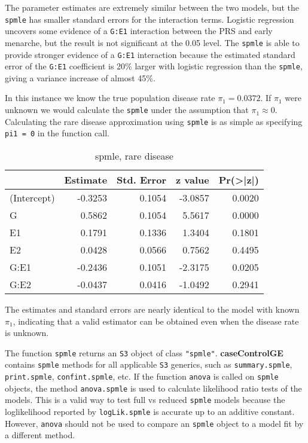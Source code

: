 \documentclass{article}\usepackage[]{graphicx}\usepackage[]{color}
\def\code#1{\texttt{#1}}
\def\pkg#1{\textbf{#1}}
\begin{document}
The parameter estimates are extremely similar between the two models, but the \code{spmle} has smaller standard errors for the interaction terms.  Logistic regression uncovers some evidence of a \code{G:E1} interaction between the PRS and early menarche, but the result is not significant at the 0.05 level.  The \code{spmle} is able to provide stronger evidence of a \code{G:E1} interaction because the estimated standard error of the \code{G:E1} coefficient is 20\% larger with logistic regression than the \code{spmle}, giving a variance increase of almost 45\%.

In this instance we know the true population disease rate $\pi_1=0.0372$.  If $\pi_1$ were unknown we would calculate the \code{spmle} under the assumption that $\pi_1 \approx 0$.  Calculating the rare disease approximation using \code{spmle} is as simple as specifying \code{pi1 = 0} in the function call.
\begin{Schunk}
\begin{table}

\caption{\label{tab:unnamed-chunk-6}spmle, rare disease}
\centering
\begin{tabular}[t]{l|r|r|r|r}
\hline
  & Estimate & Std. Error & z value & Pr(>|z|)\\
\hline
(Intercept) & -0.3253 & 0.1054 & -3.0857 & 0.0020\\
\hline
G & 0.5862 & 0.1054 & 5.5617 & 0.0000\\
\hline
E1 & 0.1791 & 0.1336 & 1.3404 & 0.1801\\
\hline
E2 & 0.0428 & 0.0566 & 0.7562 & 0.4495\\
\hline
G:E1 & -0.2436 & 0.1051 & -2.3175 & 0.0205\\
\hline
G:E2 & -0.0437 & 0.0416 & -1.0492 & 0.2941\\
\hline
\end{tabular}
\end{table}

\end{Schunk}
The estimates and standard errors are nearly identical to the model with known $\pi_1$, indicating that a valid estimator can be obtained even when the disease rate is unknown.

The function \code{spmle} returns an \code{S3} object of class \code{"spmle"}.  \pkg{caseControlGE} contains \code{spmle} methods for all applicable \code{S3} generics, such as \code{summary.spmle}, \code{print.spmle}, \code{confint.spmle}, etc.  If the function \code{anova} is called on \code{spmle} objects, the method \code{anova.spmle} is used to calculate likelihood ratio tests of the models.  This is a valid way to test full vs reduced \code{spmle} models because the loglikelihood reported by \code{logLik.spmle} is accurate up to an additive constant. However, \code{anova} should not be used to compare an \code{spmle} object to a model fit by a different method.
\end{document}

